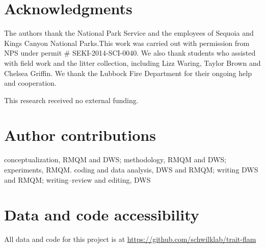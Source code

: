 \documentclass[letterpaper,12pt]{article}
\begin{document}
\section*{Acknowledgments}

The authors thank the National Park Service and the employees
  of Sequoia and Kings Canyon National Parks.This work was carried out with
  permission from NPS under permit \# SEKI-2014-SCI-0040. We also thank
  students who assisted with field work and the litter collection, including
  Lizz Waring, Taylor Brown and Chelsea Griffin. We thank the Lubbock Fire
  Department for their ongoing help and cooperation.


This research received no external funding.

\section*{Author contributions}
  conceptualization, RMQM and DWS; methodology, RMQM and
  DWS; experiments, RMQM. coding and data analysis, DWS and RMQM; writing DWS
  and RMQM; writing--review and editing, DWS

\section*{Data and code accessibility}
All data and code for this project is at \url{https://github.com/schwilklab/trait-flam}

\newpage







\end{document}
